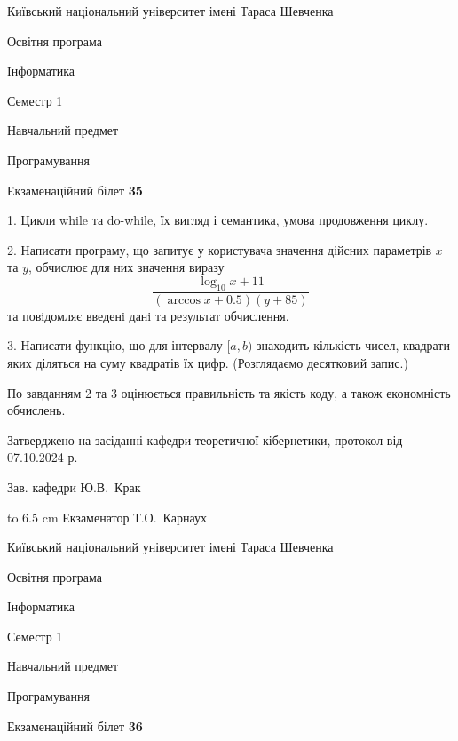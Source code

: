 \documentclass[12pt, ukrainian]{article}
\begin{document}
{{\begin {scriptsize}\par
{ \center  Київський національний університет імені Тараса Шевченка \par}
{\parbox {5 cm}{Освітня програма \hfill}{\parbox {7 cm}{Інформатика\hfill}}\parbox {6 cm}{\hfill Семестр 1}}\par
{\parbox {5 cm} {Навчальний предмет \hfill}\parbox {7 cm}{Програмування \hfill}\parbox {6cm}{\hfill}\par}\vspace{-15pt} \end{scriptsize}}{\center Екзаменаційний білет \No \textbf { 35 }\par}}
{%
1. Цикли while та do-while, їх вигляд і семантика, умова продовження циклу.%
\par
2. Написати програму, що запитує у користувача значення дійсних параметрів $x$ та $y$, обчислює для них значення виразу 
$$\frac{\log_{10} x + 11}{(\arccos x + 0.5) (y + 85)}$$ 
та повiдомляє введенi данi та результат обчислення.

\par
3. Написати функцію, що для інтервалу $[a, b)$ знаходить кількість чисел, квадрати яких діляться на суму квадратів їх цифр. (Розглядаємо десятковий запис.)

По завданням 2 та 3 оцінюється правильність та якість коду, а також економність обчислень.

}
{\smallskip\smallskip \begin {scriptsize} Затверджено на засіданні кафедри теоретичної кібернетики, протокол   від   07.10.2024 р.\par\smallskip\smallskip\smallskip\smallskip
{\parbox {6.5 cm} {Зав. кафедри \dotfill Ю.В.~Крак}}\hspace {0.7cm} {\hbox to 6.5 cm { Екзаменатор \dotfill Т.О.~Карнаух}} \end{scriptsize}}
\vspace{0.9cm}
{{\begin {scriptsize}\par
{ \center  Київський національний університет імені Тараса Шевченка \par}
{\parbox {5 cm}{Освітня програма \hfill}{\parbox {7 cm}{Інформатика\hfill}}\parbox {6 cm}{\hfill Семестр 1}}\par
{\parbox {5 cm} {Навчальний предмет \hfill}\parbox {7 cm}{Програмування \hfill}\parbox {6cm}{\hfill}\par}\vspace{-15pt} \end{scriptsize}}{\center Екзаменаційний білет \No \textbf { 36 }\par}}
\end{document}
